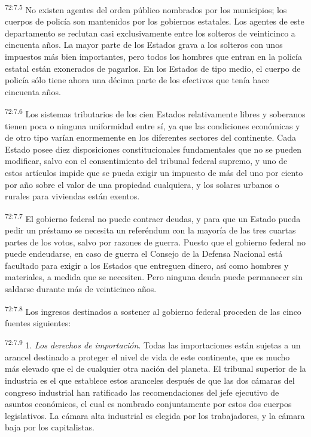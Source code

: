 \documentclass[twoside, 11pt]{book}
\begin{document}
\par
\textsuperscript{72:7.5} No existen agentes del orden público nombrados por los municipios; los cuerpos de policía son mantenidos por los gobiernos estatales. Los agentes de este departamento se reclutan casi exclusivamente entre los solteros de veinticinco a cincuenta años. La mayor parte de los Estados grava a los solteros con unos impuestos más bien importantes, pero todos los hombres que entran en la policía estatal están exonerados de pagarlos. En los Estados de tipo medio, el cuerpo de policía sólo tiene ahora una décima parte de los efectivos que tenía hace cincuenta años.

\par
\textsuperscript{72:7.6} Los sistemas tributarios de los cien Estados relativamente libres y soberanos tienen poca o ninguna uniformidad entre sí, ya que las condiciones económicas y de otro tipo varían enormemente en los diferentes sectores del continente. Cada Estado posee diez disposiciones constitucionales fundamentales que no se pueden modificar, salvo con el consentimiento del tribunal federal supremo, y uno de estos artículos impide que se pueda exigir un impuesto de más del uno por ciento por año sobre el valor de una propiedad cualquiera, y los solares urbanos o rurales para viviendas están exentos.

\par
\textsuperscript{72:7.7} El gobierno federal no puede contraer deudas, y para que un Estado pueda pedir un préstamo se necesita un referéndum con la mayoría de las tres cuartas partes de los votos, salvo por razones de guerra. Puesto que el gobierno federal no puede endeudarse, en caso de guerra el Consejo de la Defensa Nacional está facultado para exigir a los Estados que entreguen dinero, así como hombres y materiales, a medida que se necesiten. Pero ninguna deuda puede permanecer sin saldarse durante más de veinticinco años.

\par
\textsuperscript{72:7.8} Los ingresos destinados a sostener al gobierno federal proceden de las cinco fuentes siguientes:

\par
\textsuperscript{72:7.9} 1. \textit{Los derechos de importación}. Todas las importaciones están sujetas a un arancel destinado a proteger el nivel de vida de este continente, que es mucho más elevado que el de cualquier otra nación del planeta. El tribunal superior de la industria es el que establece estos aranceles después de que las dos cámaras del congreso industrial han ratificado las recomendaciones del jefe ejecutivo de asuntos económicos, el cual es nombrado conjuntamente por estos dos cuerpos legislativos. La cámara alta industrial es elegida por los trabajadores, y la cámara baja por los capitalistas.
\end{document}

